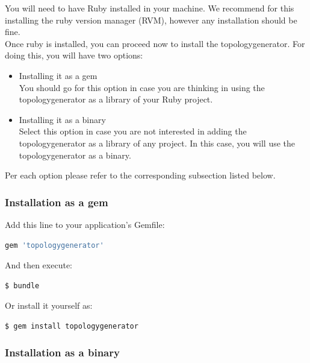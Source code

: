 You will need to have Ruby installed in your machine. We recommend for this installing the ruby version manager (RVM), however any installation should be fine.\\

Once ruby is installed, you can proceed now to install the topologygenerator. For doing this, you will have two options: 
\begin{itemize}
\item Installing it as a gem \\
You should go for this option in case you are thinking in using the topologygenerator as a library of your Ruby project. 
\item Installing it as a binary \\
Select this option in case you are not interested in adding the topologygenerator as a library of any project. In this case, you will use the topologygenerator as a binary.
\end{itemize}

Per each option please refer to the corresponding subsection listed below.

\subsubsection{Installation as a gem}

Add this line to your application's Gemfile:


\begin{lstlisting}[language=Ruby]
gem 'topologygenerator'
\end{lstlisting}

And then execute:

\begin{lstlisting}[language=bash]
$ bundle
\end{lstlisting}

Or install it yourself as: 

\begin{lstlisting}[language=bash]
$ gem install topologygenerator
\end{lstlisting}

\subsubsection{Installation as a binary}

